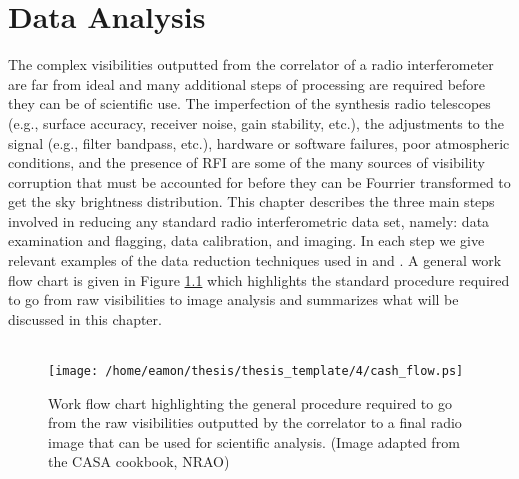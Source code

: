 
\chapter{Data Analysis} \label{chap:4}

The complex visibilities outputted from the correlator of a radio interferometer are far from ideal and many additional steps of processing are required before they can be of scientific use. The imperfection of the synthesis radio telescopes (e.g., surface accuracy, receiver noise, gain stability, etc.), the adjustments to the signal (e.g., filter bandpass, etc.), hardware or software failures, poor atmospheric conditions, and the presence of RFI are some of the many sources of visibility corruption that must be accounted for before they can be Fourrier transformed to get the sky brightness distribution. This chapter describes the three main steps involved in reducing any standard radio interferometric data set, namely: data examination and flagging, data calibration, and imaging. In each step we give relevant examples of the data reduction techniques used in \cite{ogorman_2012} and \cite{ogorman_2013}. A general work flow chart is given in Figure \ref{fig:4.1} which highlights the standard procedure required to go from raw visibilities to image analysis and summarizes what will be discussed in this chapter.\\
\\
\begin{figure}[hbt!]
\centering 
          \texttt{[image: /home/eamon/thesis/thesis\_template/4/cash\_flow.ps]}
\caption[Radio interferometry work flow chart]{Work flow chart highlighting the general procedure required to go from the raw visibilities outputted by the correlator to a final radio image that can be used for scientific analysis. (Image adapted from the CASA cookbook, NRAO)}
\label{fig:4.1}
\end{figure}

